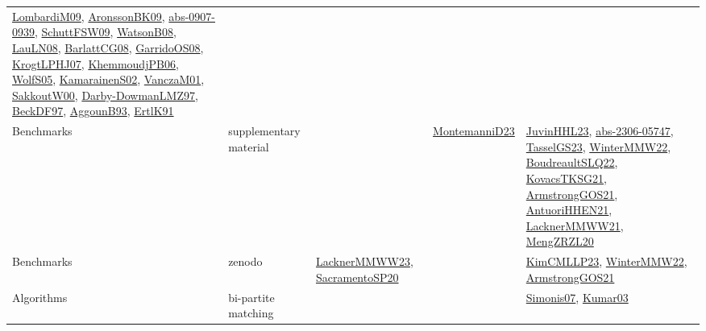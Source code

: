 {\begin{longtable}{lp{3cm}>{\raggedright}p{6cm}>{\raggedright}p{6cm}p{8cm}}
\href{papers/LombardiM09.pdf}{LombardiM09}\cite{LombardiM09}, \href{papers/AronssonBK09.pdf}{AronssonBK09}\cite{AronssonBK09}, \href{articles/abs-0907-0939.pdf}{abs-0907-0939}\cite{abs-0907-0939}, \href{papers/SchuttFSW09.pdf}{SchuttFSW09}\cite{SchuttFSW09}, \href{papers/WatsonB08.pdf}{WatsonB08}\cite{WatsonB08}, \href{papers/LauLN08.pdf}{LauLN08}\cite{LauLN08}, \href{papers/BarlattCG08.pdf}{BarlattCG08}\cite{BarlattCG08}, \href{articles/GarridoOS08.pdf}{GarridoOS08}\cite{GarridoOS08}, \href{papers/KrogtLPHJ07.pdf}{KrogtLPHJ07}\cite{KrogtLPHJ07}, \href{papers/KhemmoudjPB06.pdf}{KhemmoudjPB06}\cite{KhemmoudjPB06}, \href{papers/WolfS05.pdf}{WolfS05}\cite{WolfS05}, \href{papers/KamarainenS02.pdf}{KamarainenS02}\cite{KamarainenS02}, \href{papers/VanczaM01.pdf}{VanczaM01}\cite{VanczaM01}, \href{articles/SakkoutW00.pdf}{SakkoutW00}\cite{SakkoutW00}, \href{articles/Darby-DowmanLMZ97.pdf}{Darby-DowmanLMZ97}\cite{Darby-DowmanLMZ97}, \href{papers/BeckDF97.pdf}{BeckDF97}\cite{BeckDF97}, \href{articles/AggounB93.pdf}{AggounB93}\cite{AggounB93}, \href{papers/ErtlK91.pdf}{ErtlK91}\cite{ErtlK91}\\
Benchmarks & supplementary material &  & \href{articles/MontemanniD23.pdf}{MontemanniD23}\cite{MontemanniD23} & \href{papers/JuvinHHL23.pdf}{JuvinHHL23}\cite{JuvinHHL23}, \href{articles/abs-2306-05747.pdf}{abs-2306-05747}\cite{abs-2306-05747}, \href{papers/TasselGS23.pdf}{TasselGS23}\cite{TasselGS23}, \href{papers/WinterMMW22.pdf}{WinterMMW22}\cite{WinterMMW22}, \href{papers/BoudreaultSLQ22.pdf}{BoudreaultSLQ22}\cite{BoudreaultSLQ22}, \href{papers/KovacsTKSG21.pdf}{KovacsTKSG21}\cite{KovacsTKSG21}, \href{papers/ArmstrongGOS21.pdf}{ArmstrongGOS21}\cite{ArmstrongGOS21}, \href{papers/AntuoriHHEN21.pdf}{AntuoriHHEN21}\cite{AntuoriHHEN21}, \href{papers/LacknerMMWW21.pdf}{LacknerMMWW21}\cite{LacknerMMWW21}, \href{articles/MengZRZL20.pdf}{MengZRZL20}\cite{MengZRZL20}\\
Benchmarks & zenodo & \href{articles/LacknerMMWW23.pdf}{LacknerMMWW23}\cite{LacknerMMWW23}, \href{articles/SacramentoSP20.pdf}{SacramentoSP20}\cite{SacramentoSP20} &  & \href{papers/KimCMLLP23.pdf}{KimCMLLP23}\cite{KimCMLLP23}, \href{papers/WinterMMW22.pdf}{WinterMMW22}\cite{WinterMMW22}, \href{papers/ArmstrongGOS21.pdf}{ArmstrongGOS21}\cite{ArmstrongGOS21}\\
Algorithms & bi-partite matching &  &  & \href{articles/Simonis07.pdf}{Simonis07}\cite{Simonis07}, \href{papers/Kumar03.pdf}{Kumar03}\cite{Kumar03}\\

\end{longtable}}
